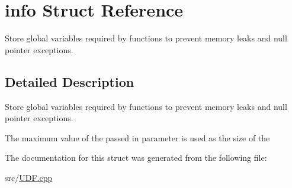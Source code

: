 \hypertarget{structinfo}{}\section{info Struct Reference}
\label{structinfo}


Store global variables required by functions to prevent memory leaks and null pointer exceptions.  




\subsection{Detailed Description}
Store global variables required by functions to prevent memory leaks and null pointer exceptions. 

The maximum value of the passed in parameter is used as the size of the 

The documentation for this struct was generated from the following file\+:\begin{DoxyCompactItemize}
\item 
src/\hyperlink{_u_d_f_8cpp}{U\+D\+F.\+cpp}\end{DoxyCompactItemize}
